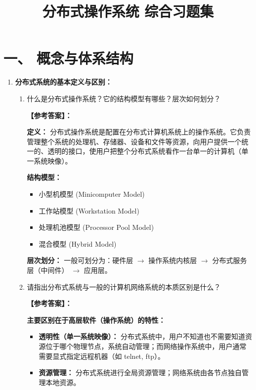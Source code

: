 \documentclass[a4paper,12pt]{article}
\title{分布式操作系统 综合习题集}
\author{}
\date{}
\newcommand{\answer}[1]{\par\vspace{0.5em}\hspace{2em}\textbf{【参考答案】：}\\{\color{blue}#1}\par\vspace{1em}}
\begin{document}
\maketitle
\tableofcontents
\newpage

\section{一、 概念与体系结构}

\begin{enumerate}[label=\arabic*.]
    \item \textbf{分布式系统的基本定义与区别：}
    \begin{enumerate}
        \item 什么是分布式操作系统？它的结构模型有哪些？层次如何划分？
        
        \answer{
        \textbf{定义：} 分布式操作系统是配置在分布式计算机系统上的操作系统。它负责管理整个系统的处理机、存储器、设备和文件等资源，向用户提供一个统一的、透明的接口，使用户把整个分布式系统看作一台单一的计算机（单一系统映像）。
        
        \textbf{结构模型：} 
        \begin{itemize}
            \item 小型机模型 (Minicomputer Model)
            \item 工作站模型 (Workstation Model)
            \item 处理机池模型 (Processor Pool Model)
            \item 混合模型 (Hybrid Model)
        \end{itemize}
        
        \textbf{层次划分：} 一般可划分为：硬件层 $\to$ 操作系统内核层 $\to$ 分布式服务层（中间件） $\to$ 应用层。
        }

        \item 请指出分布式系统与一般的计算机网络系统的本质区别是什么？
        
        \answer{
        \textbf{主要区别在于高层软件（操作系统）的特性：}
        \begin{itemize}
            \item \textbf{透明性（单一系统映像）：} 分布式系统中，用户不知道也不需要知道资源位于哪个物理节点，系统自动管理；而网络操作系统中，用户通常需要显式指定远程机器（如 telnet, ftp）。
            \item \textbf{资源管理：} 分布式系统进行全局资源管理；网络系统由各节点独自管理本地资源。
        \end{itemize}
        }


\end{enumerate}
\end{enumerate}
\end{document}
